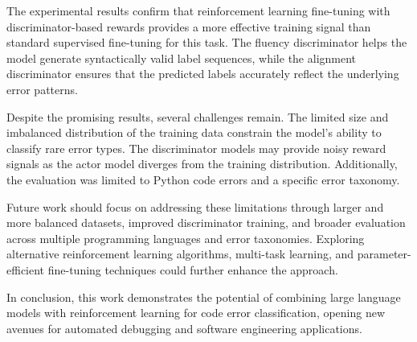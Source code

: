 The experimental results confirm that reinforcement learning fine-tuning with discriminator-based rewards provides a more effective training signal than standard supervised fine-tuning for this task. The fluency discriminator helps the model generate syntactically valid label sequences, while the alignment discriminator ensures that the predicted labels accurately reflect the underlying error patterns.

Despite the promising results, several challenges remain. The limited size and imbalanced distribution of the training data constrain the model's ability to classify rare error types. The discriminator models may provide noisy reward signals as the actor model diverges from the training distribution. Additionally, the evaluation was limited to Python code errors and a specific error taxonomy.

Future work should focus on addressing these limitations through larger and more balanced datasets, improved discriminator training, and broader evaluation across multiple programming languages and error taxonomies. Exploring alternative reinforcement learning algorithms, multi-task learning, and parameter-efficient fine-tuning techniques could further enhance the approach.

In conclusion, this work demonstrates the potential of combining large language models with reinforcement learning for code error classification, opening new avenues for automated debugging and software engineering applications.

\endgroup
\endinput
